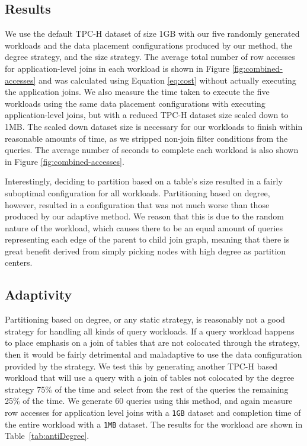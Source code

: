 \subsection{Results}
\label{sec:results}
We use the default TPC-H dataset of size 1GB with our five randomly generated workloads and the data placement configurations produced by our method, the degree strategy, and the size strategy.  The average total number of row accesses for application-level joins in each workload is shown in Figure \ref{fig:combined-accesses} and was calculated using Equation \ref{eq:cost} without actually executing the application joins.  We also measure the time taken to execute the five workloads using the same data placement configurations with executing application-level joins, but with a reduced TPC-H dataset size scaled down to 1MB.  The scaled down dataset size is necessary for our workloads to finish within reasonable amounts of time, as we stripped non-join filter conditions from the queries.  The average number of seconds to complete each workload is also shown in Figure \ref{fig:combined-accesses}.

Interestingly, deciding to partition based on a table's size resulted in a fairly suboptimal configuration for all workloads.  Partitioning based on degree, however, resulted in a configuration that was not much worse than those produced by our adaptive method. We reason that this is due to the random nature of the workload, which causes there to be an equal amount of queries representing each edge of the parent to child join graph, meaning that there is great benefit derived from simply picking nodes with high degree as partition centers.

\subsection{Adaptivity}
\label{sec:adaptivity}
Partitioning based on degree, or any static strategy, is reasonably not a good strategy for handling all kinds of query workloads.  If a query workload happens to place emphasis on a join of tables that are not colocated through the strategy, then it would be fairly detrimental and maladaptive to use the data configuration provided by the strategy.  We test this by generating another TPC-H based workload that will use a query with a join of tables not colocated by the degree strategy 75\% of the time and select from the rest of the queries the remaining 25\% of the time.  We generate 60 queries using this method, and again measure row accesses for application level joins with a \texttt{1GB} dataset and completion time of the entire workload with a \texttt{1MB} dataset.  The results for the workload are shown in Table~\ref{tab:antiDegree}.

